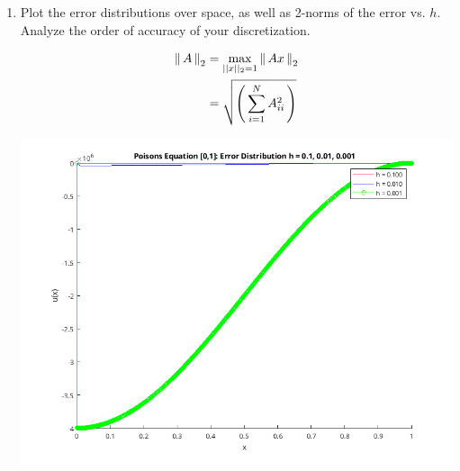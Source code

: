 \documentclass[10pt,a4paper]{report}
\newcommand{\BLUE}[1]{\textcolor{blue}{#1}}
\begin{document}
\begin{enumerate}[label=(\alph*)]
	\item Plot the error distributions over space, as well as 2-norms of the error vs. $h$.  Analyze the order of accuracy of your discretization.
	
	\BLUE{\begin{align*}
		\left \| \, A \,\right \|_2 &= \max_{|| x ||_2=1}\left \| \, Ax \,\right \|_2 \\
		&= \sqrt{ \left (\, \sum_{i=1}^N A_{ii}^2  \,\right )}
	\end{align*}
	}
	
	
	
	\includegraphics[scale=0.5]{530103b.png} 

\end{enumerate}
\end{document}
